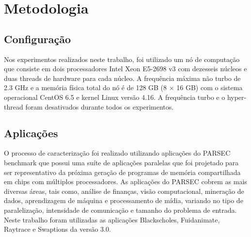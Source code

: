 \chapter{Metodologia} \label{cap:metodologia}

\section{Configuração} \label{sec:config}
Nos experimentos realizados neste trabalho, foi utilizado um nó de computação que consiste em dois processadores Intel Xeon E5-2698 v3 com dezesseis núcleos e duas threads de hardware para cada núcleo. A frequência máxima não turbo de 2.3 GHz e a memória física total do nó é de 128 GB (8 $ \times $ 16 GB) com o sistema operacional CentOS 6.5 e kernel Linux  versão 4.16. A frequência turbo e o hyper-thread foram desativados durante todos os experimentos.


\section{Aplicações} \label{sec:apps}

O processo de caracterização foi realizado utilizando aplicações do PARSEC benchmark que possui uma suíte de aplicações paralelas que foi projetado para ser representativo da próxima geração de programas de memória compartilhada em chips com múltiplos processadores. As aplicações do PARSEC cobrem as mais diversas áreas, tais como, análise de finanças, visão computacional, mineração de dados, aprendizagem de máquina e processamento de mídia, variando no tipo de paralelização, intensidade de comunicação e tamanho do problema de entrada. Neste trabalho foram utilizadas as aplicações Blackscholes, Fuidanimate, Raytrace e Swaptions da versão 3.0.

